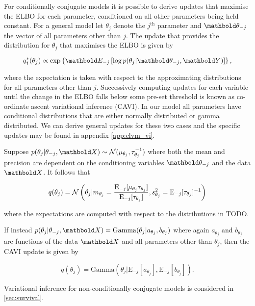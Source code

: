 For conditionally conjugate models it is possible to derive updates that maximise the ELBO for each parameter, conditioned on all other parameters being held constant. For a general model let $\theta_j$ denote the $j^{\text{th}}$ parameter and  $\mbtheta_{-j}$ the vector of all parameters other than $j$. The update that provides the distribution for $\theta_j$ that maximises the ELBO is given by

\begin{equation}
q^*_j(\theta_j) \propto \exp \left\{  \mbE_{-j} \left[ \log p(\theta_j | \mbtheta_{-j}, \mbY) \right]
 \right\},
\end{equation}

where the expectation is taken with respect to the approximating distributions for all parameters other than $j$. Successively computing updates for each variable until the change in the ELBO falls below some pre-set threshold is known as co-ordinate ascent variational inference (CAVI). In our model all parameters have conditional distributions that are either normally distributed or gamma distributed. We can derive general updates for these two cases and the specific updates may be found in appendix \ref{app:clvm_vi}.

Suppose $p(\theta_j | \theta_{-j}, \mbX) \sim \norm(\mu_{\theta_j}, \tau_{\theta_j}^{-1})$ where both the mean and precision  are dependent on the conditioning variables $\mbtheta_{-j}$ and the data $\mbX$. It follows that

\begin{equation}
q(\theta_j) = \mathcal{N}\left(
\theta_j |
m_{\theta_j} = \frac{\text{E}_{-j}[\mu_{\theta_j} \tau_{\theta_j}]}{\text{E}_{-j}[\tau_{\theta_j}]},
s_{\theta_j}^2 = \text{E}_{-j}[\tau_{\theta_j}]^{-1}
\right)
\end{equation}

where the expectations are computed with respect to the distributions in TODO.

If instead $p(\theta_j | \theta_{-j}, \mbX) = \text{Gamma}(\theta_j | a_{\theta_j}, b_{\theta_j})$ where again $a_{\theta_j}$ and $b_{\theta_j}$ are functions of the data $\mbX$ and all parameters other than $\theta_j$, then the CAVI update 	is given by

\begin{equation}
q(\theta_j) = \text{Gamma}\left(
\theta_j |
\text{E}_{-j}[a_{\theta_j}], \text{E}_{-j}[b_{\theta_j}]
\right).
\end{equation}


Variational inference for non-conditionally conjugate models is considered in \ref{sec:survival}.

